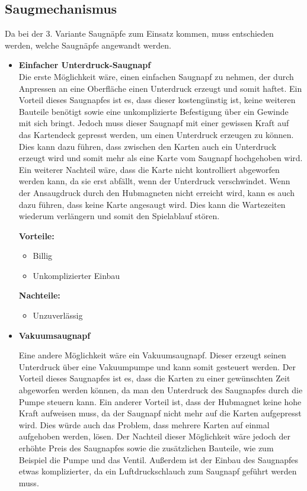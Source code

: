 \subsection{Saugmechanismus}

Da bei der 3. Variante Saugnäpfe zum Einsatz kommen, muss entschieden werden, welche Saugnäpfe angewandt werden.

\begin{itemize}
    \item \textbf{Einfacher Unterdruck-Saugnapf} \\
    Die erste Möglichkeit wäre, einen einfachen Saugnapf zu nehmen, der durch Anpressen an eine Oberfläche einen Unterdruck erzeugt und somit haftet.
    Ein Vorteil dieses Saugnapfes ist es, dass dieser kostengünstig ist, keine weiteren Bauteile benötigt sowie eine unkomplizierte Befestigung über ein Gewinde mit sich bringt.
    Jedoch muss dieser Saugnapf mit einer gewissen Kraft auf das Kartendeck gepresst werden, um einen Unterdruck erzeugen zu können.
    Dies kann dazu führen, dass zwischen den Karten auch ein Unterdruck erzeugt wird und somit mehr als eine Karte vom Saugnapf hochgehoben wird.
    Ein weiterer Nachteil wäre, dass die Karte nicht kontrolliert abgeworfen werden kann, da sie erst abfällt, wenn der Unterdruck verschwindet.
    Wenn der Ansaugdruck durch den Hubmagneten nicht erreicht wird, kann es auch dazu führen, dass keine Karte angesaugt wird.
    Dies kann die Wartezeiten wiederum verlängern und somit den Spielablauf stören.

    \textbf{Vorteile:}
    \begin{itemize}
        \item Billig
        \item Unkomplizierter Einbau
    \end{itemize}
    \textbf{Nachteile:}
    \begin{itemize}
        \item Unzuverlässig
    \end{itemize}

    \item \textbf{Vakuumsaugnapf}

    Eine andere Möglichkeit wäre ein Vakuumsaugnapf.
    Dieser erzeugt seinen Unterdruck über eine Vakuumpumpe und kann somit gesteuert werden.
    Der Vorteil dieses Saugnapfes ist es, dass die Karten zu einer gewünschten Zeit abgeworfen werden können, da man den Unterdruck des Saugnapfes durch die Pumpe steuern kann.
    Ein anderer Vorteil ist, dass der Hubmagnet keine hohe Kraft aufweisen muss, da der Saugnapf nicht mehr auf die Karten aufgepresst wird.
    Dies würde auch das Problem, dass mehrere Karten auf einmal aufgehoben werden, lösen.
    Der Nachteil dieser Möglichkeit wäre jedoch der erhöhte Preis des Saugnapfes sowie die zusätzlichen Bauteile, wie zum Beispiel die Pumpe und das Ventil.
    Außerdem ist der Einbau des Saugnapfes etwas komplizierter, da ein Luftdruckschlauch
    zum Saugnapf geführt werden muss.


\end{itemize}
